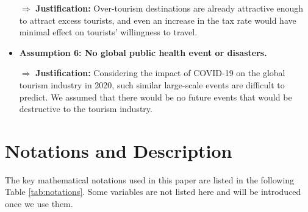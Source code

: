 \documentclass{mcmthesis}
\begin{document}
\begin{itemize}
  $\Rightarrow$ \textbf{Justification:} Over-tourism destinations are already attractive enough to attract excess tourists, and even an increase in the tax rate would have minimal effect on tourists' willingness to travel.
  \item \textbf{Assumption 6: No global public health event or disasters.}
  
  $\Rightarrow$ \textbf{Justification:} Considering the impact of COVID-19 on the global tourism industry in 2020, such similar large-scale events are difficult to predict. We assumed that there would be no future events that would be destructive to the tourism industry.
\end{itemize}


\section{Notations and Description}
{The key mathematical notations used in this paper are listed in the following Table \ref{tab:notations}. Some variables are not listed here and will be introduced once we use them.}
\end{document}
